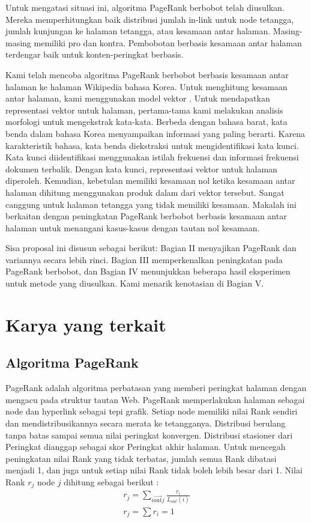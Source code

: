 \documentclass[conference]{IEEEtran}
\begin{document}
Untuk mengatasi situasi ini, algoritma PageRank berbobot \cite{xing2004weighted, qiao2010simrank,kumar2013pagerank} telah diusulkan. Mereka memperhitungkan baik distribusi jumlah in-link untuk node tetangga, jumlah kunjungan ke halaman tetangga, atau kesamaan antar halaman. Masing-masing memiliki pro dan kontra. Pembobotan berbasis kesamaan antar halaman terdengar baik untuk konten-peringkat berbasis.

Kami telah mencoba algoritma PageRank berbobot berbasis kesamaan antar halaman ke halaman Wikipedia bahasa Korea. Untuk menghitung kesamaan antar halaman, kami menggunakan model vektor \cite{resnik1999semantic}. Untuk mendapatkan representasi vektor untuk halaman, pertama-tama kami melakukan analisis morfologi untuk mengekstrak kata-kata. Berbeda dengan bahasa barat, kata benda dalam bahasa Korea menyampaikan informasi yang paling berarti. Karena karakteristik bahasa, kata benda diekstraksi untuk mengidentifikasi kata kunci. Kata kunci diidentifikasi menggunakan istilah frekuensi dan informasi frekuensi dokumen terbalik. Dengan kata kunci, representasi vektor untuk halaman diperoleh. Kemudian, kebetulan memiliki kesamaan nol ketika kesamaan antar halaman dihitung menggunakan produk dalam dari vektor tersebut. Sangat canggung untuk halaman tetangga yang tidak memiliki kesamaan. Makalah ini berkaitan dengan peningkatan PageRank berbobot berbasis kesamaan antar halaman untuk menangani kasus-kasus dengan tautan nol kesamaan.

Sisa proposal ini disusun sebagai berikut: Bagian II menyajikan PageRank dan variannya secara lebih rinci. Bagian III memperkenalkan peningkatan pada PageRank berbobot, dan Bagian IV menunjukkan beberapa hasil eksperimen untuk metode yang diusulkan. Kami menarik kenotasian di Bagian V.

\section{Karya yang terkait}

\subsection{Algoritma PageRank}

PageRank \cite{brin1998anatomy} adalah algoritma perbatasan yang memberi peringkat halaman dengan mengacu pada struktur tautan Web. PageRank memperlakukan halaman sebagai node dan hyperlink sebagai tepi grafik. Setiap node memiliki nilai Rank sendiri dan mendistribusikannya secara merata ke tetangganya. Distribusi berulang tanpa batas sampai semua nilai peringkat konvergen. Distribusi stasioner dari Peringkat dianggap sebagai skor Peringkat akhir halaman. Untuk mencegah peningkatan nilai Rank yang tidak terbatas, jumlah semua Rank dibatasi menjadi 1, dan juga untuk setiap nilai Rank tidak boleh lebih besar dari 1. Nilai Rank \(r_{j}\) node \(j\) dihitung sebagai berikut :
\begin{eqnarray}
    r_{j} = \sum_{i\overrightarrow{\text {out}} j}{\frac {r_{i}} {L_{out}(i)}}\\
    r_{j} = \sum r_{ i } = 1
\end{eqnarray}
\end{document}
